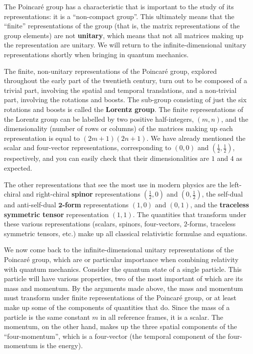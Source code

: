 \documentclass[12pt]{article}
\begin{document}
The Poincaré group has a characteristic that is important to the study of its representations: it is a ``non-compact group''. This ultimately means that the ``finite'' representations of the group (that is, the matrix representations of the group elements) are not \textbf{unitary}, which means that not all matrices making up the representation are unitary. We will return to the infinite-dimensional unitary representations shortly when bringing in quantum mechanics.
\newline

The finite, non-unitary representations of the Poincaré group, explored throughout the early part of the twentieth century, turn out to be composed of a trivial part, involving the spatial and temporal translations, and a non-trivial part, involving the rotations and boosts. The sub-group consisting of just the six rotations and boosts is called the \textbf{Lorentz group}. The finite representations of the Lorentz group can be labelled by two positive half-integers, $\left(m,n\right)$, and the dimensionality (number of rows or columns) of the matrices making up each representation is equal to $\left(2m+1\right)\left(2n+1\right)$. We have already mentioned the scalar and four-vector representations, corresponding to $\left(0,0\right)$ and $\left(\tfrac{1}{2},\tfrac{1}{2}\right)$, respectively, and you can easily check that their dimensionalities are $1$ and $4$ as expected.
\newline

The other representations that see the most use in modern physics are the left-chiral and right-chiral \textbf{spinor} representations $\left(\tfrac{1}{2},0\right)$ and $\left(0,\tfrac{1}{2}\right)$, the self-dual and anti-self-dual $\mathbf{2}$\textbf{-form} representations $\left(1,0\right)$ and $\left(0,1\right)$, and the \textbf{traceless symmetric tensor} representation $\left(1,1\right)$. The quantities that transform under these various representations (scalars, spinors, four-vectors, $2$-forms, traceless symmetric tensors, etc.) make up all classical relativistic formulae and equations.
\newline

We now come back to the infinite-dimensional unitary representations of the Poincaré group, which are or particular importance when combining relativity with quantum mechanics. Consider the quantum state of a single particle. This particle will have various properties, two of the most important of which are its mass and momentum. By the arguments made above, the mass and momentum must transform under finite representations of the Poincaré group, or at least make up some of the components of quantities that do. Since the mass of a particle is the same constant $m$ in all reference frames, it is a scalar. The momentum, on the other hand, makes up the three spatial components of the ``four-momentum'', which is a four-vector (the temporal component of the four-momentum is the energy).
\newline
\end{document}
